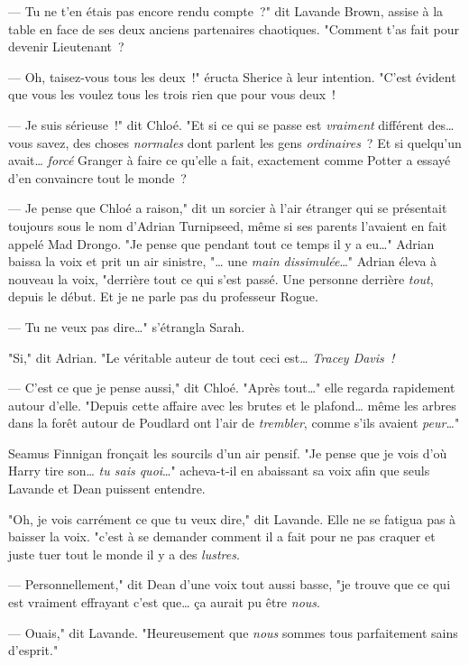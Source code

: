 --- Tu ne t'en étais pas encore rendu compte~?" dit Lavande Brown, assise à la table en face de ses deux anciens partenaires chaotiques. "Comment t'as fait pour devenir Lieutenant~?

--- Oh, taisez-vous tous les deux~!" éructa Sherice à leur intention. "C'est évident que vous les voulez tous les trois rien que pour vous deux~!

--- Je suis sérieuse~!" dit Chloé. "Et si ce qui se passe est \emph{vraiment} différent des… vous savez, des choses \emph{normales} dont parlent les gens \emph{ordinaires}~? Et si quelqu'un avait… \emph{forcé} Granger à faire ce qu'elle a fait, exactement comme Potter a essayé d'en convaincre tout le monde~?

--- Je pense que Chloé a raison," dit un sorcier à l'air étranger qui se présentait toujours sous le nom d'Adrian Turnipseed, même si ses parents l'avaient en fait appelé Mad Drongo. "Je pense que pendant tout ce temps il y a eu…" Adrian baissa la voix et prit un air sinistre, "… une \emph{main dissimulée}…" Adrian éleva à nouveau la voix, "derrière tout ce qui s'est passé. Une personne derrière \emph{tout}, depuis le début. Et je ne parle pas du professeur Rogue.

--- Tu ne veux pas dire…" s'étrangla Sarah.

"Si," dit Adrian. "Le véritable auteur de tout ceci est… \emph{Tracey Davis~!}

--- C'est ce que je pense aussi," dit Chloé. "Après tout…" elle regarda rapidement autour d'elle. "Depuis cette affaire avec les brutes et le plafond… même les arbres dans la forêt autour de Poudlard ont l'air de \emph{trembler}, comme s'ils avaient \emph{peur…}"

Seamus Finnigan fronçait les sourcils d'un air pensif. "Je pense que je vois d'où Harry tire son… \emph{tu sais quoi}…" acheva-t-il en abaissant sa voix afin que seuls Lavande et Dean puissent entendre.

"Oh, je vois carrément ce que tu veux dire," dit Lavande. Elle ne se fatigua pas à baisser la voix. "c'est à se demander comment il a fait pour ne pas craquer et juste tuer tout le monde il y a des \emph{lustres}.

--- Personnellement," dit Dean d'une voix tout aussi basse, "je trouve que ce qui est vraiment effrayant c'est que… ça aurait pu être \emph{nous}.

--- Ouais," dit Lavande. "Heureusement que \emph{nous} sommes tous parfaitement sains d'esprit."

